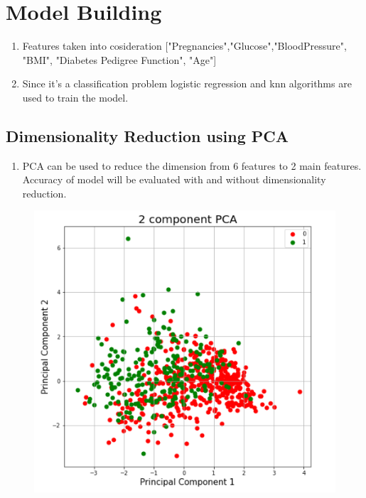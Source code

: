 \documentclass[12pt]{article}
\begin{document}
\section{Model Building}


\begin{enumerate}
\item Features taken into cosideration    ["Pregnancies","Glucose","BloodPressure", "BMI", "Diabetes Pedigree Function", "Age"]
\item Since it's a classification problem logistic regression and knn algorithms are used to train the model.
\end{enumerate}

\subsection{Dimensionality Reduction using PCA}
\begin{enumerate}
\item PCA can be used to reduce the dimension from 6 features to 2 main features. Accuracy of model will be evaluated with and without dimensionality reduction.
\end{enumerate}

\newpage

\begin{figure}[h]
\centering
\includegraphics[scale=0.7]{PCA.PNG} 
\label{etiqueta}
\end{figure}
\end{document}
